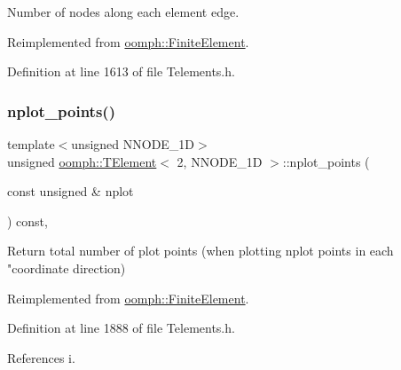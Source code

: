 Number of nodes along each element edge. 



Reimplemented from \hyperlink{classoomph_1_1FiniteElement_ab65c7a94dda80c1876a09ac12be4e39c}{oomph\+::\+Finite\+Element}.



Definition at line 1613 of file Telements.\+h.

\mbox{\label{classoomph_1_1TElement_3_012_00_01NNODE__1D_01_4_ad0c4aa55367140690c697ded11f234c0}} 
\subsubsection{\texorpdfstring{nplot\+\_\+points()}{nplot\_points()}}
{\footnotesize\ttfamily template$<$unsigned N\+N\+O\+D\+E\+\_\+1D$>$ \\
unsigned \hyperlink{classoomph_1_1TElement}{oomph\+::\+T\+Element}$<$ 2, N\+N\+O\+D\+E\+\_\+1D $>$\+::nplot\+\_\+points (\begin{DoxyParamCaption}\item[{const unsigned \&}]{nplot }\end{DoxyParamCaption}) const\hspace{0.3cm}{\ttfamily [inline]}, {\ttfamily [virtual]}}

Return total number of plot points (when plotting nplot points in each "coordinate direction) 

Reimplemented from \hyperlink{classoomph_1_1FiniteElement_a8ed563c7ff0cfd8bafdbb0132b388106}{oomph\+::\+Finite\+Element}.



Definition at line 1888 of file Telements.\+h.



References i.

\mbox{\label{classoomph_1_1TElement_3_012_00_01NNODE__1D_01_4_a4f82b26b291f8d00592e48729c8f5bfb}} 
